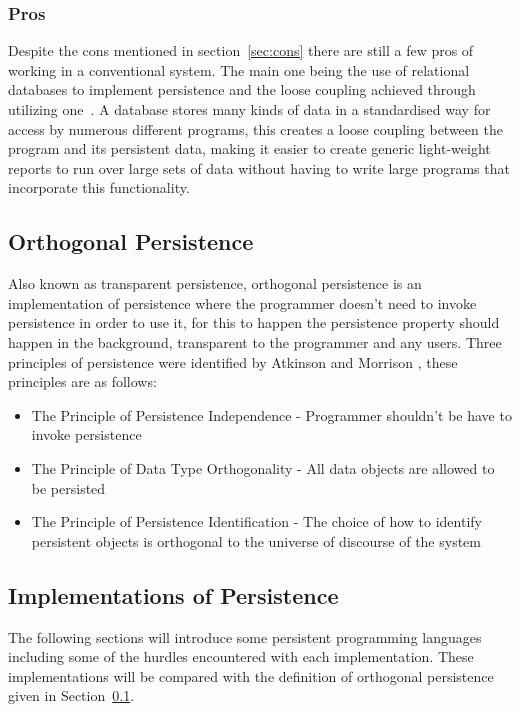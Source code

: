 \documentclass[a4,12pt]{article}
\begin{document}
\subsubsection{Pros}
Despite the cons mentioned in section~\ref{sec:cons} there are still a few pros of working in a conventional system. The main one being the use of relational databases to implement persistence and the loose coupling achieved through utilizing one~\citep{Databases}.
A database stores many kinds of data in a standardised way for access by numerous different programs, this creates a loose coupling between the program and its persistent data, making it easier to create generic light-weight reports to run over large sets of data without having to write large programs that incorporate this functionality.
\subsection{Orthogonal Persistence}\label{sec:orthogonal}
Also known as transparent persistence, orthogonal persistence is an implementation of persistence where the programmer doesn't need to invoke persistence in order to use it, for this to happen the persistence property should happen in the background, transparent to the programmer and any users.
Three principles of persistence were identified by Atkinson and Morrison \citep{Atkinson}, these principles are as follows:
\begin{itemize}
    \item{The Principle of Persistence Independence - Programmer shouldn't be have to invoke persistence}
    \item{The Principle of Data Type Orthogonality - All data objects are allowed to be persisted}
    \item{The Principle of Persistence Identification - The choice of how to identify persistent objects is orthogonal to the universe of discourse of the system}
\end{itemize}
\subsection{Implementations of Persistence}\label{sec:persistentLanguages}
The following sections will introduce some persistent programming languages including some of the hurdles encountered with each implementation. These implementations will be compared with the definition of orthogonal persistence given in Section~\ref{sec:orthogonal}.
\end{document}
